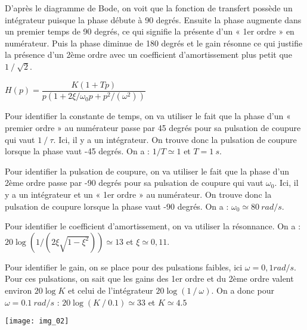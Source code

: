

\ifprof
\begin{corrige}
D’après le diagramme de Bode, on voit que la fonction de transfert possède un intégrateur puisque la phase débute à 90 degrés. Ensuite la phase augmente dans un premier temps de 90 degrés, ce qui signifie la présente d’un « 1er ordre » en numérateur. Puis la phase diminue de 180 degrés  et le gain résonne ce qui justifie la présence d’un 2ème ordre avec un coefficient d’amortissement plus petit que $1⁄\sqrt{2}$.

$H(p)=\dfrac{K(1+Tp)}{p(1+2\xi/\omega_0  p+p^2/(\omega^2 ))}$

Pour identifier la constante de temps, on va utiliser le fait que la phase d’un « premier ordre » au numérateur passe par 45 degrés pour sa pulsation de coupure qui vaut $1⁄\tau$.
Ici, il y a un intégrateur. On trouve donc la pulsation de coupure lorsque la phase vaut -45 degrés. On a :
$1/T\simeq 1$ et $T=\SI{1}{s}$.

Pour identifier la pulsation de coupure, on va utiliser le fait que la phase d’un 2ème ordre passe par -90 degrés pour sa pulsation de coupure qui vaut $\omega_0$.
Ici, il y a un intégrateur et un « 1er ordre » au numérateur. On trouve donc la pulsation de coupure lorsque la phase vaut -90 degrés. On a :
$\omega_0\simeq \SI{80}{rad/s}$.

Pour identifier le coefficient d’amortissement, on va utiliser la résonnance. On a :
$20\log(1/(2\xi\sqrt{1-\xi^2 }))\simeq 13$ et $\xi\simeq 0,11$.

Pour identifier le gain, on se place pour des pulsations faibles, ici $\omega=0,1 rad/s$. Pour ces pulsations, on sait que les gains des 1er ordre et du 2ème ordre valent environ $20\log K$ et celui de l’intégrateur $20\log(1⁄\omega)$. On a donc pour $\omega=\SI{0,1}{rad/s}$ :
$20\log(K⁄0.1)\simeq 33$ et $K\simeq4.5$

\end{corrige}
\else

\begin{center}
\texttt{[image: img\_02]}
\end{center}
\fi


